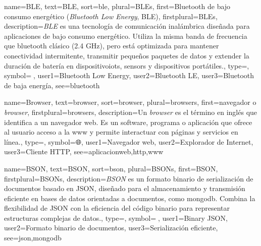 	{
		name={BLE},
		text={BLE},
		sort={ble},
		plural={BLEs},
		first={Bluetooth de bajo consumo energ{\'e}tico (\textit{Bluetooth Low Energy}, BLE)},
		firstplural={BLEs},
		description={\emph{BLE} es una tecnolog{\'i}a de comunicaci{\'o}n inal{\'a}mbrica dise{\~n}ada para aplicaciones de bajo consumo energ{\'e}tico. Utiliza la misma banda de frecuencia que \gls{bluetooth} cl{\'a}sico (2.4 GHz), pero est{\'a} optimizada para mantener \gls{conectividad} intermitente, transmitir peque{\~n}os paquetes de \glspl{dato} y extender la duraci{\'o}n de bater{\'i}a en \glspl{dispositivoiot}, \glspl{sensor} y dispositivos port{\'a}tiles.},
		type=\glsdefaulttype,
		symbol={🔵},
		user1={Bluetooth Low Energy},
		user2={Bluetooth LE},
		user3={Bluetooth de baja energ{\'i}a},
		see={bluetooth}
	}
	
	
	{
		name={Browser},
		text={browser},
		sort={browser},
		plural={browsers},
		first={navegador o \emph{browser}},
		firstplural={browsers},
		description={Un \emph{browser} es el t{\'e}rmino en ingl{\'e}s que identifica a un navegador web. Es un software, programa o aplicaci{\'o}n que ofrece al usuario acceso a la \gls{www} y permite interactuar con p{\'a}ginas y servicios en l{\'i}nea.},
		type=\glsdefaulttype,
		symbol={🌐},
		user1={Navegador web},
		user2={Explorador de Internet},
		user3={Cliente HTTP},
		see={aplicacionweb,http,www}
	}
	
	{
		name={BSON},
		text={BSON},
		sort={bson},
		plural={BSONs},
		first={BSON},
		firstplural={BSONs},
		description={\emph{BSON} es un formato binario de serializaci{\'o}n de documentos basado en JSON, dise{\~n}ado para el almacenamiento y transmisi{\'o}n eficiente en bases de datos orientadas a documentos, como \gls{mongodb}. Combina la flexibilidad de JSON con la eficiencia del c{\'o}digo binario para representar estructuras complejas de datos.},
		type=\glsdefaulttype,
		symbol={📄},
		user1={Binary JSON},
		user2={Formato binario de documentos},
		user3={Serializaci{\'o}n eficiente},
		see={json,mongodb}
	}
	
